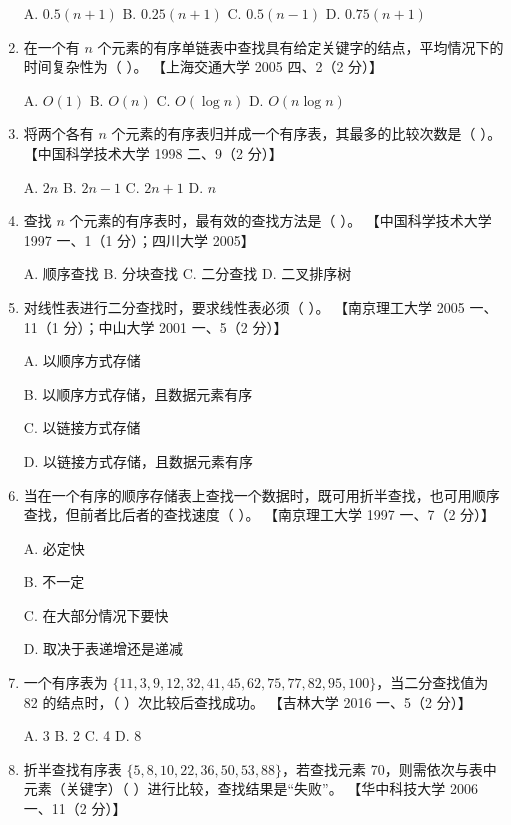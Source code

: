 \documentclass[lang=cn,newtx,10pt,scheme=chinese]{elegantbook}
\begin{document}
\begin{enumerate}
    A. $0.5(n+1)$ \quad B. $0.25(n+1)$ \quad C. $0.5(n-1)$ \quad D. $0.75(n+1)$  

    \item 在一个有 $n$ 个元素的有序单链表中查找具有给定关键字的结点，平均情况下的时间复杂性为（ ）。  
    【上海交通大学 2005 四、2（2 分）】 

    A. $O(1)$ \quad B. $O(n)$ \quad C. $O(\log n)$ \quad D. $O(n \log n)$  

    \item 将两个各有 $n$ 个元素的有序表归并成一个有序表，其最多的比较次数是（ ）。  
    【中国科学技术大学 1998 二、9（2 分）】

    A. $2n$ \quad B. $2n-1$ \quad C. $2n+1$ \quad D. $n$  

    \item 查找 $n$ 个元素的有序表时，最有效的查找方法是（ ）。  
    【中国科学技术大学 1997 一、1（1 分）；四川大学 2005】  

    A. 顺序查找 \quad B. 分块查找 \quad C. 二分查找 \quad D. 二叉排序树  

    \item 对线性表进行二分查找时，要求线性表必须（ ）。  
    【南京理工大学 2005 一、11（1 分）；中山大学 2001 一、5（2 分）】  

    A. 以顺序方式存储  

    B. 以顺序方式存储，且数据元素有序  

    C. 以链接方式存储  

    D. 以链接方式存储，且数据元素有序  

    \item 当在一个有序的顺序存储表上查找一个数据时，既可用折半查找，也可用顺序查找，但前者比后者的查找速度（ ）。  
    【南京理工大学 1997 一、7（2 分）】  

    A. 必定快  

    B. 不一定  

    C. 在大部分情况下要快  

    D. 取决于表递增还是递减  

    \item 一个有序表为 $\{11, 3, 9, 12, 32, 41, 45, 62, 75, 77, 82, 95, 100\}$，当二分查找值为 82 的结点时，（ ）次比较后查找成功。  
    【吉林大学 2016 一、5（2 分）】  

    A. 3 \quad B. 2 \quad C. 4 \quad D. 8  

    \item 折半查找有序表 $\{5, 8, 10, 22, 36, 50, 53, 88\}$，若查找元素 70，则需依次与表中元素（关键字）（ ）进行比较，查找结果是“失败”。  
    【华中科技大学 2006 一、11（2 分）】  


\end{enumerate}
\end{document}
